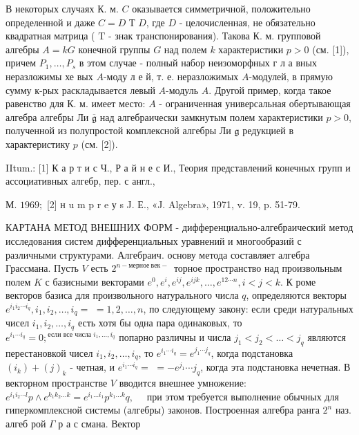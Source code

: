 \documentclass[10pt]{article}
\begin{document}
В некоторых случаях К. м. $C$ оказывается симметричной, положительно определенной и даже $C=D$ Т $D$, где $D$ - целочисленная, не обязательно квадратная матрица ( $\mathrm{T}$ - знак транспонирования). Такова К. м. групповой алгебры $A=k G$ конечной группы $G$ над полем $k$ характеристики $p>0$ (см. [1]), причем $P_{1}, \ldots, P_{s}$ в этом случае - полный набор неизоморфных г л а вных неразложимы хе вых $A$-моду л е й, т. е. неразложимых $A$-модулей, в прямую сумму к-рых раскладывается левый $A$-модуль $A$. Другой пример, когда такое равенство для К. м. имеет место: $A$ - ограниченная универсальная обертывающая алгебра алгебры Ли $\overline{\mathfrak{g}}$ над алгебраически замкнутым полем характеристики $p>0$, полученной из полупростой комплексной алгебры Ли $\mathfrak{g}$ редукцией в характеристику $p$ (см. [2]).



IItum.: [1] К а р т и с Ч., Р а й н е с И., Теория представлений конечных групп и ассоциативных алгебр, пер. с англ.,

М. $1969 ;$ [2] н u m p r e у s J. Е., «J. Algebra», 1971, v. 19, p. 51-79.



КАРТАНА МЕТОД ВНЕШНИХ ФОРМ - дифференциально-алгебраический метод исследования систем дифференциальных уравнений и многообразий с различными структурами. Алгебраич. основу метода составляет алгебра Грассмана. Пусть $V$ есть $2^{n-м е р н о е ~ в е к-~}$ торное пространство над произвольным полем $K$ с базисными векторами $e^{0}, e^{i}, e^{i j}, e^{i j k}, \ldots, e^{12 \cdots n}, i<j<k$. К роме векторов базиса для произвольного натурального числа $q$, определяются векторы $e^{i_{1} i_{2} \cdots i_{q}}, i_{1}, i_{2}, \ldots, i_{q}=$ $=1,2, \ldots, n$, по следующему закону: если среди натуральных чисел $i_{1}, i_{2}, \ldots, i_{q}$ есть хотя бы одна пара одинаковых, то $e^{i_{1} \cdots i_{q}}=0 ;{ }^{\text {если все числа } i_{1}, \ldots, i_{q}}$ попарно различны и числа $j_{1}<j_{2}<\ldots<j_{q}$ являются перестановкой чисел $i_{1}, i_{2}, \ldots, i_{q}$, то $e^{i_{1} \cdots i_{q}}=e^{j_{1} \cdots j_{q}}$, когда подстановка $\left(i_{k}\right)+(j)_{k}$ - четная, и $e^{i_{1} \cdots i_{q}}=$ $=-e^{j_{1}} \cdots j_{q}$, когда эта подстановка нечетная. В векторном пространстве $V$ вводится внешнее умножение: $e^{i_{1} i_{2} \cdots l} p \wedge e^{k_{1} k_{2} \ldots k}=e^{i_{1} \ldots i_{1}} p^{k_{1} \ldots k} q, \quad$ при этом требуется выполнение обычных для гиперкомплексной системы (алгебры) законов. Построенная алгебра ранга $2^{n}$ наз. алгеб рой $\Gamma$ р а с смана. Вектор
\end{document}
